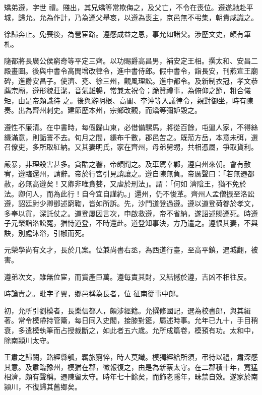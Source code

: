 \begin{pinyinscope}
 矯弟遵，字世
 禮。賤出，其兄矯等常欺侮之，及父亡，不令在喪位。遵遂馳赴平城，歸允。允為作計，乃為遵父舉哀，以遵為喪主，京邑無不弔集，朝貴咸識之。



 徐歸奔止。免喪後，為營宦路。遵感成益之恩，事允如諸父。涉歷文史，頗有筆札。



 隨都將長廣公侯窮奇等平定三齊。以功賜爵高昌男，補安定王相。撰太和、安昌二殿畫圖。後與中書令高閭增改律令，進中書侍郎。假中書令，詣長安，刊燕宣王廟碑，進爵安昌子。使濟、兗、徐三州，觀風理訟。進中都令。及新制衣冠，孝文恭薦宗廟，遵形貌莊潔，音氣雄暢，常兼太祝令；跪贊禮事，為俯仰之節，粗合儀矩，由是帝頗識待
 之。後與游明根、高閭、李沖等入議律令，親對御坐，時有陳奏。出為齊州刺史。建節歷本州，宗鄉改觀，而矯等彌妒毀之。



 遵性不廉清。在中書時，每假歸山東，必借備騾馬，將從百餘，屯逼人家，不得絲縑滿意，則詬詈不去。旬月之間，縑布千數，郡邑苦之。既蒞方岳，本意未弭，選召僚吏，多所取紅納。又其妻明氏，家在齊州，母弟舅甥，共相憑屬，爭取貨利。



 嚴暴，非理殺害甚多。貪酷之響，帝頗聞之。及車駕幸鄴，遵自州來朝。會有赦宥，遵臨還州，請辭。帝於行宮引見誚讓之。遵自陳無負。帝厲聲曰：「若無遷都赦，必無高遵矣！又卿非唯貪婪，又虐於刑法」。謂：「何如
 濟陰王，猶不免於法。卿何人，而為此行！自今宜自謹約。」還州，仍不悛革。齊州人孟僧振至洛訟遵，詔廷尉少卿鄧述窮鞫，皆如所訴。先，沙門道登過遵。遵以道登荷眷於孝文，多奉以貨，深託仗之。道登屢因言次，申啟救遵，帝不省納，遂詔述賜遵死。時遵子元榮詣洛訟冤，猶恃道登，不時還赴。道登知事決，方乃遣之。遵恨其妻，不與訣，別處沐浴，引椒而死。



 元榮學尚有文才，長於几案。位兼尚書右丞，為西道行臺，至高平鎮，遇城翻，被害。



 遵弟次文，雖無位宦，而貲產巨萬。遵每責其財，又結憾於遵，吉凶不相往反。



 時論責之。毗字子翼，鄉邑稱為長者，位
 征南從事中郎。



 初，允所引劉模者，長樂信都人，頗涉經籍。允撰修國記，選為校書郎，與其緝著。常令模帶持管籥，每日同入史閣，接膝對筵，屬述時事。允年已九十，手目稍衰，多遣模執筆而占授裁斷之，如此者五六歲。允所成篇卷，模預有功。太和中，除南潁川太守。



 王肅之歸闕，路經縣瓠，羈旅窮悴，時人莫識。模獨經給所須，弔待以禮，肅深感其意。及肅臨豫州，模猶在郡，徵報復之，由是為新蔡太守。在二郡積十年，寬猛相濟，頗有聲稱。遷陳留太守。時年七十餘矣，而飾老隱年，昧禁自效。遂家於南潁川，不復歸其舊鄉矣。




\end{pinyinscope}
